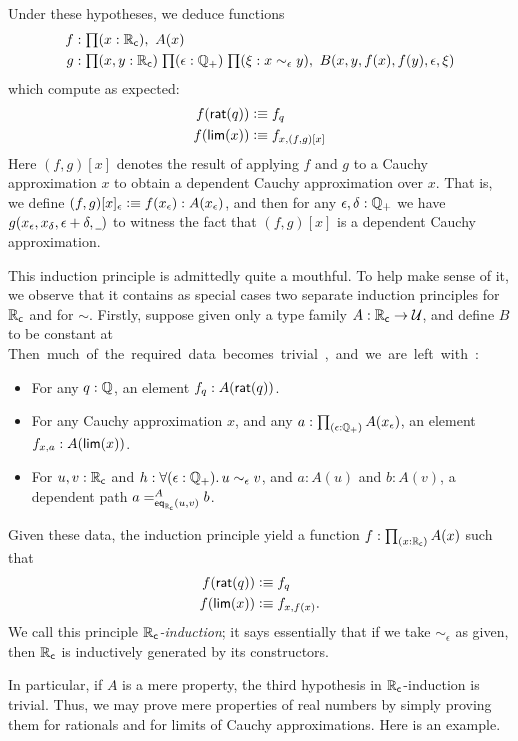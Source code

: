 Under these hypotheses, we deduce functions
\begin{align*}
  f&:\prd{x:\RC} A(x)\\
  g&:\prd{x,y:\RC}{\epsilon:\Qp}{\xi:x\sim_{\epsilon} y} B(x,y,f(x),f(y),\epsilon,\xi)
\end{align*}
which compute as expected:
\begin{align*}
  f(\rcrat(q)) &\defeq f_q\\
  f(\rclim(x)) &\defeq f_{x,(f,g)[x]}
\end{align*}
Here $(f,g)[x]$ denotes the result of applying $f$ and $g$ to a Cauchy approximation $x$ to obtain a dependent Cauchy approximation over $x$.
That is, we define $(f,g)[x]_\epsilon \defeq f(x_\epsilon) : A(x_\epsilon)$, and then for any $\epsilon,\delta:\Qp$ we have $g(x_\epsilon,x_\delta,\epsilon+\delta,\blank)$ to witness the fact that $(f,g)[x]$ is a dependent Cauchy approximation.

This induction principle is admittedly quite a mouthful.
To help make sense of it, we observe that it contains as special cases two separate induction principles for $\RC$ and for $\sim$.
Firstly, suppose given only a type family $A:\RC\to\type$, and define $B$ to be constant at \unit.
Then much of the required data becomes trivial, and we are left with:
\begin{itemize}
\item For any $q : \Q$, an element $f_q:A(\rcrat(q))$.
\item For any Cauchy approximation $x$, and any $a:\prd{\epsilon:\Qp} A(x_\epsilon)$, an element $f_{x,a}:A(\rclim(x))$.
\item For $u, v : \RC$ and $h:\fall{\epsilon : \Qp} u \sim_\epsilon v$, and $a:A(u)$ and $b:A(v)$, a dependent path $\dpath{A}{\rceq(u,v)}{a}{b}$.
\end{itemize}
Given these data, the induction principle yield a function $f:\prd{x:\RC} A(x)$ such that
\begin{align*}
  f(\rcrat(q)) &\defeq f_q\\
  f(\rclim(x)) &\defeq f_{x,f(x)}.
\end{align*}
We call this principle \emph{$\RC$-induction}; it says essentially that if we take $\sim_\epsilon$ as given, then $\RC$ is inductively generated by its constructors.

In particular, if $A$ is a mere property, the third hypothesis in $\RC$-induction is trivial.
Thus, we may prove mere properties of real numbers by simply proving them for rationals and for limits of Cauchy approximations.
Here is an example.

